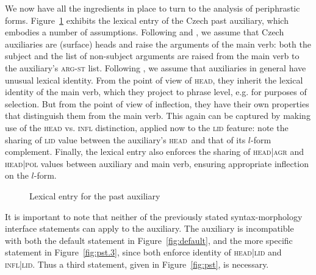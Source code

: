\documentclass[output=paper]{langsci/langscibook}
\begin{document}
We now have all the ingredients in place to turn to the analysis of periphrastic forms. Figure~\ref{fig:LE:aux} exhibits the lexical entry of the Czech past auxiliary, which embodies a number of assumptions.  Following \citet{Hana07} and \citet{Petkevic15}, we assume that Czech auxiliaries are (surface) heads and raise the arguments of the main verb: both the subject \negmedspace{} and the list of non-subject arguments  are raised from the main verb to the auxiliary's \textsc{arg-st} list. Following \citet{Bonami14d}, we assume that auxiliaries in general have unusual lexical identity. From the point of view of \textsc{head}, they inherit the lexical identity of the main verb, which they project to phrase level, e.g. for purposes of selection. But from the point of view of inflection, they have their own properties that distinguish them from the main verb. This again can be captured by making use of the \textsc{head} vs. \textsc{infl} distinction, applied now to the \textsc{lid} feature: note the sharing of \textsc{lid} value \negmedspace\avm{\2} between the auxiliary's \textsc{head} and that of its $l$-form complement. Finally, the lexical entry also enforces the sharing of \textsc{head|agr} and \textsc{head|pol} values between auxiliary and main verb, ensuring appropriate inflection on the $l$-form.

\begin{figure}
\caption{Lexical entry for the past auxiliary\label{fig:LE:aux}}
\end{figure}

It is important to note that neither of the previously stated syntax-morphology interface statements can apply to the auxiliary. The auxiliary is incompatible with both the default statement in Figure~\ref{fig:default}, and the more specific statement  in Figure~\ref{fig:pst.3}, since both enforce identity of \textsc{head|lid} and \textsc{infl|lid}. Thus a third statement, given in Figure~\ref{fig:pst}, is necessary. 
\end{document}
